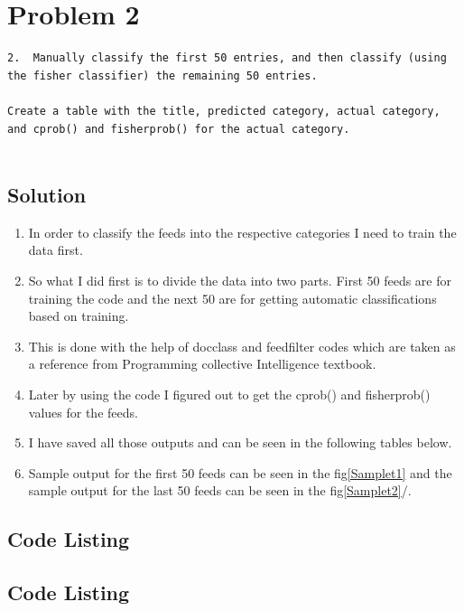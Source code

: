 

\section{Problem 2}
\label{part2}
\begin{verbatim}
2.  Manually classify the first 50 entries, and then classify (using
the fisher classifier) the remaining 50 entries. 

Create a table with the title, predicted category, actual category,
and cprob() and fisherprob() for the actual category.


\end{verbatim}

\subsection{Solution}
\begin{enumerate}
\item In order to classify the feeds into the respective categories I need to train the data first.
\item So what I did first is to divide the data into two parts. First 50 feeds are for training the code and the next 50 are for getting automatic classifications based on training.
\item This is done with the help of docclass and feedfilter codes which are taken as a reference from Programming collective Intelligence textbook.
\item Later by using the code I figured out to get the cprob() and fisherprob() values for the feeds.
\item I have saved all those outputs and can be seen in the following tables below.
\item Sample output for the first 50 feeds can be seen in the fig\ref{Samplet1} and the sample output for the last 50 feeds can be seen in the fig\ref{Samplet2}/.
\end{enumerate}
\newpage

\subsection{Code Listing}


\newpage

\subsection{Code Listing}

